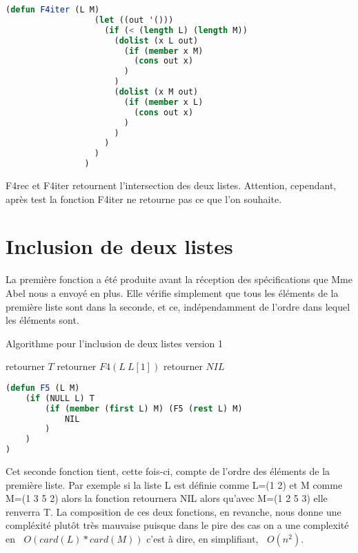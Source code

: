 \documentclass[a4paper, 12pt, leqno]{report}
\theoremstyle{plain}
\newcommand{\bigO}[1]{\ensuremath{\mathop{}\mathopen{}O\mathopen{}\left(#1\right)}}
\begin{document}
            \begin{lstlisting}[label=some-code,caption=F4 (L M) version itérative,language=lisp]
                (defun F4iter (L M)
	              (let ((out '()))
		            (if (< (length L) (length M))
			          (dolist (x L out) 
				        (if (member x M)
					      (cons out x)
				        ) 
			          )
			          (dolist (x M out)
				        (if (member x L)
					      (cons out x)
				        )
			          )
		            )
	              )
                )
            \end{lstlisting}       
F4rec et F4iter retournent l'intersection des deux listes. Attention, cependant, après test la fonction F4iter ne retourne pas ce que l'on souhaite.
          

        \section{Inclusion de deux listes}
        La première fonction a été produite avant la réception des spécifications que Mme Abel nous a envoyé en plus. Elle vérifie simplement que tous les éléments de la première liste sont dans la seconde, et ce, indépendamment de l’ordre dans lequel les éléments sont.
                    \begin{algorithm}
            \caption{Algorithme pour l'inclusion de deux listes version 1}
            \begin{algorithmic}
                \State retourner $T$
                     \State retourner $F4(L \ L[1])$
            \Else                   
                    \State retourner $NIL$
            \EndIf        
            \end{algorithmic}
            \end{algorithm}
        \newpage
        \begin{lstlisting}[label=some-code,caption=F5 (N L) version recursive 1,language=lisp]
(defun F5 (L M) 
	(if (NULL L) T 
		(if (member (first L) M) (F5 (rest L) M) 
			NIL
		)
	)
)
            \end{lstlisting}
          Cet seconde fonction tient, cette fois-ci, compte de l’ordre des éléments de la première liste. Par exemple si la liste L est définie comme L=(1 2) et M comme M=(1 3 5 2) alors la fonction retournera NIL alors qu’avec M=(1 2 5 3) elle renverra T. La composition de ces deux fonctions, en revanche, nous donne une compléxité plutôt très mauvaise puisque dans le pire des cas on a une complexité en $\bigO{card(L)*card(M)}$ c’est à dire, en simplifiant, $\bigO{n^2}$.
\end{document}
